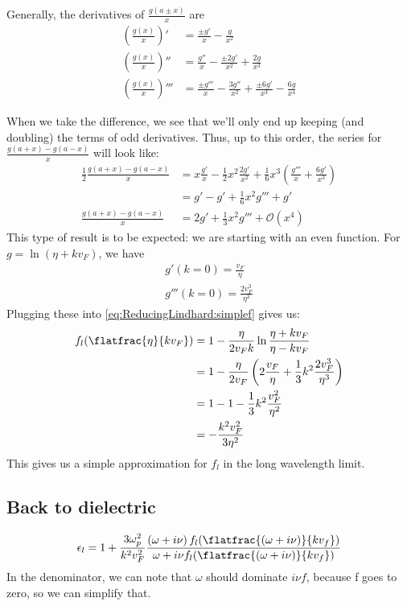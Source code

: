 \documentclass[../../main.tex]{subfiles}
\newcommand{\vf}{v_F}
\begin{document}
Generally, the derivatives of $\frac{g(a \pm x)}{x}$ are
\begin{align}
	\left(\frac{g(x)}{x} \right)' &= \frac{\pm g'}{x} - \frac{g}{x^2} \\
	\left(\frac{g(x)}{x} \right)'' &= \frac{g''}{x} - \frac{\pm 2g'}{x^2}+ \frac{2 g}{x^3} \\
	\left(\frac{g(x)}{x} \right)''' &= \frac{\pm g'''}{x} - \frac{  3g''}{x^2}+ \frac{\pm 6 g'}{x^3} - \frac{6 g} {x^4}
\end{align}

When we take the difference, we see that we'll only end up keeping (and doubling) the terms of odd derivatives. Thus, up to this order, the series for $\frac{g(a + x) - g(a - x)}{x}$ will look like:
\begin{align}
	\frac12 \frac{g(a + x) - g(a - x)}{x} &= x \frac{g'}{x} - \frac12 x^2 \frac{2 g'}{x^2} + \frac16 x^3 \left( \frac{g'''}{x} + \frac{6 g'}{x^3} \right) \\
	&= g' - g' + \frac16 x^2 g''' + g' \\
	\frac{g(a + x) - g(a - x)}{x} &= 2g' + \frac13 x^2 g''' + \mathcal{O}(x^4)
\end{align}
This type of result is to be expected: we are starting with an even function. For $g = \ln(\eta + k \vf)$, we have
\begin{align}
	g'(k = 0) = \frac{\vf}{\eta} \\
	g'''(k = 0) = \frac{2 \vf^3}{\eta^3}
\end{align}
Plugging these into \eqref{eq:ReducingLindhard:simplef} gives us:
\begin{align}
	f_l(\flatfrac{\eta}{k \vf}) &= 1 - \frac{\eta}{2 \vf k} \ln\frac{\eta + k \vf}{\eta - k\vf} \\
	&= 1- \frac{\eta}{2\vf} \left( 2 \frac{\vf}{\eta} + \frac13 k^2 \frac{2 \vf^3}{\eta^3} \right) \\
	&= 1 - 1 - \frac13 k^2 \frac{\vf^2}{\eta^2}	\\
	&= - \frac{k^2 \vf^2}{3 \eta^2} \label{eq:ReducingLindhard:f}
\end{align}
This gives us a simple approximation for $f_l$ in the long wavelength limit.

\subsection{Back to dielectric}
\begin{equation} \label{eq:ReducingLindhard:EpsWithF} 
 \epsilon_l = 1 + \frac{3 \omega_p^2}{k^2 v_F^2} \frac{\left(\omega + i \nu \right) f_l(\flatfrac{(\omega + i \nu)}{k v_f})}{\omega + i \nu f_l(\flatfrac{(\omega + i \nu)}{k v_f})}
\end{equation}
In the denominator, we can note that $\omega$ should dominate $i \nu f$, because f goes to zero, so we can simplify that. 
\end{document}
